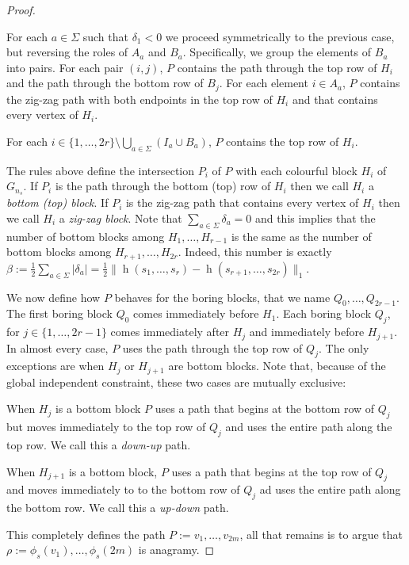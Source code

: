 \documentclass{patmorin}
\DeclareMathOperator{\hist}{h}
\begin{document}
\begin{proof}
\begin{compactenum}
        \item For each $a\in\Sigma$ such that $\delta_1<0$ we proceed symmetrically to the previous case, but reversing the roles of $A_a$ and $B_a$.  Specifically, we group the elements of $B_a$ into pairs.  For each pair $(i,j)$, $P$ contains the path through the top row of $H_i$ and the path through the bottom row of $B_j$.  For each element $i\in A_a$, $P$ contains the zig-zag path with both endpoints in the top row of $H_i$ and that contains every vertex of $H_i$.

        \item For each $i\in\{1,\ldots,2r\}\setminus\bigcup_{a\in\Sigma}(I_a\cup B_a)$, $P$ contains the top row of $H_i$.
    \end{compactenum}
    The rules above define the intersection $P_i$ of $P$ with each colourful block $H_i$ of $G_{n_s}$.  If $P_i$ is the path through the bottom (top) row of $H_i$ then we call $H_i$ a \emph{bottom (top) block}.  If $P_i$ is the zig-zag path that contains every vertex of $H_i$ then we call $H_i$ a \emph{zig-zag block}.  Note that $\sum_{a\in\Sigma} \delta_a = 0$ and this implies that the number of bottom blocks among $H_1,\ldots,H_{r-1}$ is the same as the number of bottom blocks among $H_{r+1},\ldots,H_{2r}$.  Indeed, this number is exactly $\beta:=\tfrac{1}{2}\sum_{a\in\Sigma} |\delta_a|=\tfrac{1}{2}\|\hist(s_1,\ldots,s_r)-\hist(s_{r+1},\ldots,s_{2r})\|_1$.

    We now define how $P$ behaves for the boring blocks, that we name $Q_0,\ldots,Q_{2r-1}$. The first boring block $Q_0$ comes immediately before $H_1$. Each boring block $Q_j$, for $j\in\{1,\ldots,2r-1\}$ comes immediately after $H_j$ and immediately before $H_{j+1}$.  In almost every case, $P$ uses the path through the top row of $Q_j$.  The only exceptions are when $H_j$ or $H_{j+1}$ are bottom blocks. Note that, because of the global independent constraint, these two cases are mutually exclusive:
    \begin{compactenum}
        \item When $H_j$ is a bottom block $P$ uses a path that begins at the bottom row of $Q_j$ but moves immediately to the top row of $Q_j$ and uses the entire path along the top row. We call this a \emph{down-up} path.
        \item When $H_{j+1}$ is a bottom block, $P$ uses a path that begins at the top row of $Q_j$ and moves immediately to to the bottom row of $Q_j$ ad uses the entire path along the bottom row.  We call this a \emph{up-down} path.
    \end{compactenum}
    This completely defines the path $P:=v_1,\ldots,v_{2m}$, all that remains is to argue that $\rho:=\phi_s(v_1),\ldots,\phi_s(2m)$ is anagramy.


\end{proof}
\end{document}
